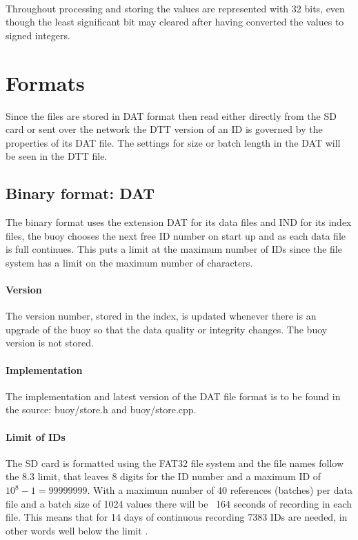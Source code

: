 \documentclass[a4paper]{article}
\begin{document}
\begin{multicols}{2}
    \paragraph{} Throughout processing and storing the values are
    represented with 32 bits, even though the least significant bit may
    cleared after having converted the values to signed integers.

  \section{Formats}
  Since the files are stored in DAT format then read either directly
  from the SD card or sent over the network the DTT version of an ID is
  governed by the properties of its DAT file. The settings for size or
  batch length in the DAT will be seen in the DTT file.

  \subsection{Binary format: DAT}
  The binary format uses the extension DAT for its data files and IND
  for its index files, the buoy chooses the next free ID number on start
  up and as each data file is full continues. This puts a limit at the
  maximum number of IDs since the file system has a limit on the maximum
  number of characters.

  \paragraph{Version} The version number, stored in the index,
  is updated whenever there is an upgrade of the buoy so that the
  data quality or integrity changes. The buoy version is not stored.

  \paragraph{Implementation}
  The implementation and latest version of the DAT file format is to be
  found in the source: buoy/store.h and buoy/store.cpp.

  \paragraph{Limit of IDs}
  The SD card is formatted using the FAT32 file system and the file
  names follow the 8.3 limit, that leaves 8 digits for the ID number and
  a maximum ID of $10^8 - 1 = 99999999$. With a maximum number of 40 references
  (batches) per data file and a batch size of 1024 values there will be
  ~164 seconds of recording in each file. This means that for 14 days of
  continuous recording 7383 IDs are needed, in other words well below
  the limit \cite{local_data_capacity_budget}.


\end{multicols}
\end{document}
